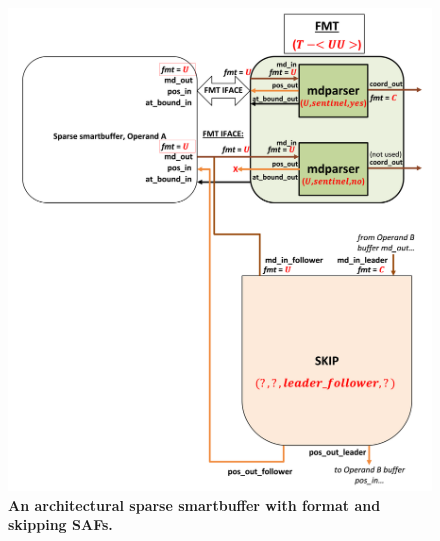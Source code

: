 \begin{figure}[H]
\includegraphics[width=\textwidth]{figures/safinference_build_08skipportfmt.png}
\caption{\textbf{An architectural sparse smartbuffer with format and skipping SAFs.}}
\label{fig:safinference_build_08skipportfmt}
\centering
\end{figure}



